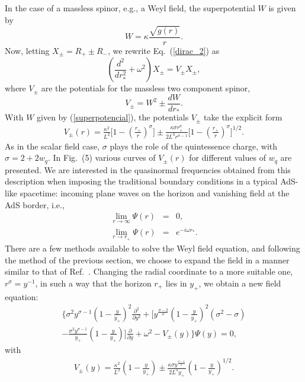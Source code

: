 \documentclass[preprint]{revtex4-1}
\def\be{\begin{eqnarray}}
\def\ee{\end{eqnarray}}
\begin{document}
In the case of a massless spinor, e.g., a Weyl field, the superpotential $W$ is given by
\begin{equation}\label{superpotencial}
W=\kappa \frac{\sqrt{g(r)}}{r}.
\end{equation}
Now, letting $X_{\pm}=R_{+}\pm R_{-}$, we rewrite Eq.~(\ref{dirac_2}) as
\begin{equation}
\left(\frac{d^{2}}{dr_{*}^{2}}+\omega^2\right)X_{\pm}=V_{\pm}X_{\pm},
\end{equation}
where $V_{\pm}$ are the potentials for the massless two component spinor, 
\begin{equation}
V_{\pm}=W^{2}\pm \frac{dW}{dr_{*}}.
\end{equation}
With $W$ given by (\ref{superpotencial}), the potentials $V_{\pm}$ take the explicit form
\be
\label{w2}
V_\pm (r) = \frac{\kappa^2}{L^2}\bigg[ 1 - \left( \frac{r_+}{r} \right)^\sigma \bigg] \pm \frac{\kappa \sigma r_+^\sigma}{2L^3r^{\sigma -1 }} \bigg[ 1 - \left( \frac{r_+}{r} \right)^\sigma \bigg]^{1/2}.
\ee
As in the scalar field case, $\sigma$ plays the role of the quintessence charge, with $\sigma = 2+2w_q$. In Fig.~(5) various curves of $V_{\pm}(r)$ for different values of $w_q$ are presented. We are interested in the quasinormal frequencies obtained from this description when imposing the traditional boundary conditions in a typical AdS-like spacetime: incoming plane waves on the horizon and vanishing field at the AdS border, i.e., 
\be
\label{w3}
\lim_{r \rightarrow \infty} \Psi (r) & = & 0, \\
\label{w3b}
\lim_{r \rightarrow r_+} \Psi (r) & = & e^{-i \omega r_*}.
\ee
There are a few methods available to solve the Weyl field equation, and following the method of the previous section, we choose to expand the field in a manner similar to that of Ref.~\cite{Horowitz:1999jd}. Changing the radial coordinate to a more suitable one, $r^\sigma = y^{-1}$, in such a way that the horizon $r_+$ lies in $y_+$, we obtain a new field equation: 
\be
\nonumber
\Bigg\{ \sigma^2 y^{\sigma -1}\left(1 - \frac{y}{y_+} \right)^2\frac{\partial^2}{\partial y^2} + \Bigg[ y^{\frac{\sigma-2}{\sigma}}\left(1 - \frac{y}{y_+} \right)^2(\sigma^2-\sigma) \\
\label{w4}
- \frac{\sigma^2 y^{\sigma -1 }}{y_+}\left(1 - \frac{y}{y_+} \right)\Bigg] \frac{\partial}{\partial y} + \omega^2  - V_\pm (y)\Bigg\}\Psi(y) = 0,
\ee
with
\be
\label{w5}
V_\pm (y)= \frac{\kappa^2}{L^2}\left( 1 - \frac{y}{y_+}\right) \pm \frac{\kappa \sigma y^{\frac{\sigma - 1 }{\sigma}}}{2L^3 y_+}\left( 1 - \frac{y}{y_+}\right)^{1/2}.
\ee
\end{document}
